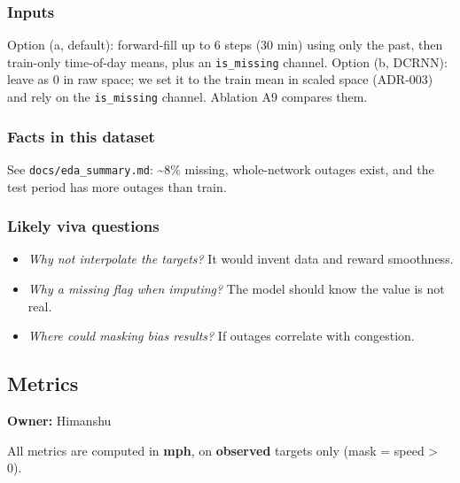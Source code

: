 \documentclass[10pt,a4paper]{article}
\begin{document}
\subsubsection*{Inputs}
Option (a, default): forward-fill up to 6 steps (30 min) using only the past, then train-only time-of-day means, plus an \texttt{is\_\allowbreak{}missing} channel. Option (b, DCRNN): leave as 0 in raw space; we set it to the train mean in scaled space (ADR-003) and rely on the \texttt{is\_\allowbreak{}missing} channel. Ablation A9 compares them.

\subsubsection*{Facts in this dataset}
See \texttt{docs/\allowbreak{}eda\_\allowbreak{}summary.md}: \textasciitilde{}8\% missing, whole-network outages exist, and the test period has more outages than train.

\subsubsection*{Likely viva questions}
\begin{itemize}[nosep,leftmargin=*]
\item \emph{Why not interpolate the targets?} It would invent data and reward smoothness.
\item \emph{Why a missing flag when imputing?} The model should know the value is not real.
\item \emph{Where could masking bias results?} If outages correlate with congestion.
\end{itemize}

\subsection*{Metrics}
\textbf{Owner:} Himanshu

All metrics are computed in \textbf{mph}, on \textbf{observed} targets only (mask = speed > 0).
\end{document}
